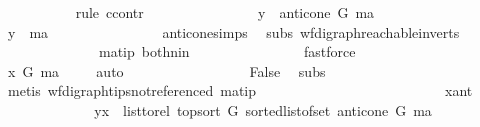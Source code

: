 \begin{isabellebody}
\ \ \ \ \ \ \ \ \ \ \isamarkupfalse%
{\isacharparenleft}{\kern0pt}rule\ ccontr{\isacharparenright}{\kern0pt}\ \isanewline
\ \ \ \ \ \ \ \ \ \ \ \ \isamarkupfalse%
\ {\isachardoublequoteopen}{\isasymnot}\ y\ {\isasymin}\ anticone\ G\ ma\ {\isachardoublequoteclose}\isanewline
\ \ \ \ \ \ \ \ \ \ \ \ \isamarkupfalse%
\ \isamarkupfalse%
\ {\isachardoublequoteopen}y\ {\isacharequal}{\kern0pt}\ ma{\isachardoublequoteclose}\isanewline
\ \ \ \ \ \ \ \ \ \ \ \ \ \ \isamarkupfalse%
\ anticone{\isachardot}{\kern0pt}simps\ \isamarkupfalse%
\ subs\ wf{\isacharunderscore}{\kern0pt}digraph{\isachardot}{\kern0pt}reachable{}{\isacharunderscore}{\kern0pt}in{\isacharunderscore}{\kern0pt}verts{\isacharparenleft}{\kern0pt}{}{\isacharparenright}{\kern0pt}\ {}{\isacharparenleft}{\kern0pt}{}{\isacharcomma}{\kern0pt}{}{\isacharparenright}{\kern0pt}\ \isanewline
\ \ \ \ \ \ \ \ \ \ \ \ \ \ ma{\isacharunderscore}{\kern0pt}tip\ both{\isacharunderscore}{\kern0pt}nin\isanewline
\ \ \ \ \ \ \ \ \ \ \ \ \ \ \isamarkupfalse%
\ fastforce\ \ \isanewline
\ \ \ \ \ \ \ \ \ \ \ \ \ \ \isamarkupfalse%
\ \isamarkupfalse%
\ {\isachardoublequoteopen}x\ {\isasymrightarrow}\isactrlsup {\isacharplus}{\kern0pt}\isactrlbsub G\isactrlesub \ ma{\isachardoublequoteclose}\ \isamarkupfalse%
\ {}{\isacharparenleft}{\kern0pt}{}{\isacharparenright}{\kern0pt}\ \isamarkupfalse%
\ auto\isanewline
\ \ \ \ \ \ \ \ \ \ \ \ \ \ \isamarkupfalse%
\ \isamarkupfalse%
\ False\ \isamarkupfalse%
\ subs\ \ {}{\isacharparenleft}{\kern0pt}{}{\isacharparenright}{\kern0pt}\isanewline
\ \ \ \ \ \ \ \ \ \ \ \ \ \ \ \ \isamarkupfalse%
\ {\isacharparenleft}{\kern0pt}metis\ wf{\isacharunderscore}{\kern0pt}digraph{\isachardot}{\kern0pt}tips{\isacharunderscore}{\kern0pt}not{\isacharunderscore}{\kern0pt}referenced\ ma{\isacharunderscore}{\kern0pt}tip{\isacharparenright}{\kern0pt}\ \ \isanewline
\ \ \ \ \ \ \ \ \ \ \ \ \isamarkupfalse%
\isanewline
\ \ \ \ \ \ \ \ \ \ \isamarkupfalse%
\ x{\isacharunderscore}{\kern0pt}ant\isanewline
\ \ \ \ \ \ \ \ \ \ \isamarkupfalse%
\ \isamarkupfalse%
\ {\isachardoublequoteopen}{\isacharparenleft}{\kern0pt}y{\isacharcomma}{\kern0pt}x{\isacharparenright}{\kern0pt}\ {\isasymin}\ list{\isacharunderscore}{\kern0pt}to{\isacharunderscore}{\kern0pt}rel\ {\isacharparenleft}{\kern0pt}top{\isacharunderscore}{\kern0pt}sort\ G\ {\isacharparenleft}{\kern0pt}sorted{\isacharunderscore}{\kern0pt}list{\isacharunderscore}{\kern0pt}of{\isacharunderscore}{\kern0pt}set\ {\isacharparenleft}{\kern0pt}anticone\ G\ ma{\isacharparenright}{\kern0pt}{\isacharparenright}{\kern0pt}{\isacharparenright}{\kern0pt}{\isachardoublequoteclose}\isanewline

\end{isabellebody}
